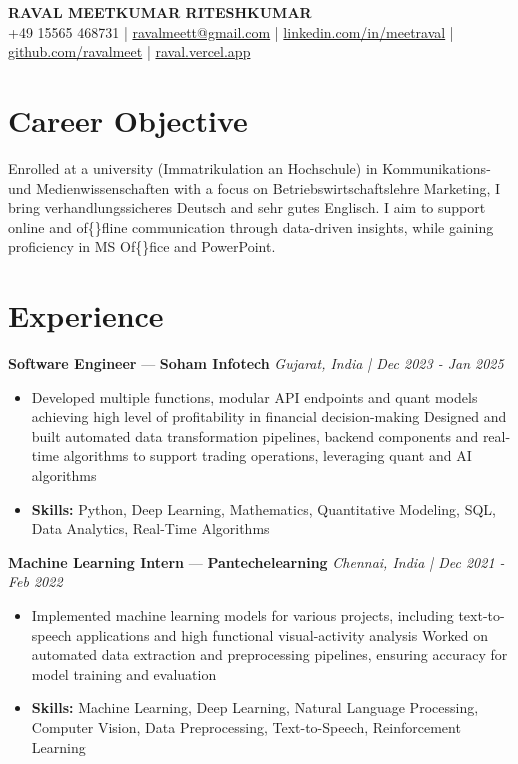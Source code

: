 \documentclass[a4paper,10pt]{article}
\begin{document}
\begin{center}
  {\Large\bfseries RAVAL MEETKUMAR RITESHKUMAR}\\[2pt]
  {\small +49 15565 468731 \;|\; \href{mailto:ravalmeett@gmail.com}{ravalmeett@gmail.com} \;|\; \href{https://www.linkedin.com/in/meetraval/}{linkedin.com/in/meetraval} \;|\; \href{https://github.com/ravalmeet}{github.com/ravalmeet} \;|\; \href{https://raval.vercel.app/}{raval.vercel.app}}
\end{center}
\vspace{-3pt}

\section*{Career Objective}
Enrolled at a university (Immatrikulation an Hochschule) in Kommunikations- und Medienwissenschaften with a focus on Betriebswirtschaftslehre Marketing, I bring verhandlungssicheres Deutsch and sehr gutes Englisch. I aim to support online and of\{\}fline communication through data-driven insights, while gaining proficiency in MS Of\{\}fice and PowerPoint.\par

\section*{Experience}
\textbf{Software Engineer} — \textbf{Soham Infotech} \hfill \textit{Gujarat, India \;|\; Dec 2023 - Jan 2025}\par
\vspace{1pt}
\begin{itemize}
  \item Developed multiple functions, modular API endpoints and quant models achieving high level of profitability in financial decision-making Designed and built automated data transformation pipelines, backend components and real-time algorithms to support trading operations, leveraging quant and AI algorithms
  \item \textbf{Skills:} Python, Deep Learning, Mathematics, Quantitative Modeling, SQL, Data Analytics, Real-Time Algorithms
\end{itemize}
\vspace{3pt}
\textbf{Machine Learning Intern} — \textbf{Pantechelearning} \hfill \textit{Chennai, India \;|\; Dec 2021 - Feb 2022}\par
\vspace{1pt}
\begin{itemize}
  \item Implemented machine learning models for various projects, including text-to-speech applications and high functional visual-activity analysis Worked on automated data extraction and preprocessing pipelines, ensuring accuracy for model training and evaluation
  \item \textbf{Skills:} Machine Learning, Deep Learning, Natural Language Processing, Computer Vision, Data Preprocessing, Text-to-Speech, Reinforcement Learning
\end{itemize}
\end{document}
